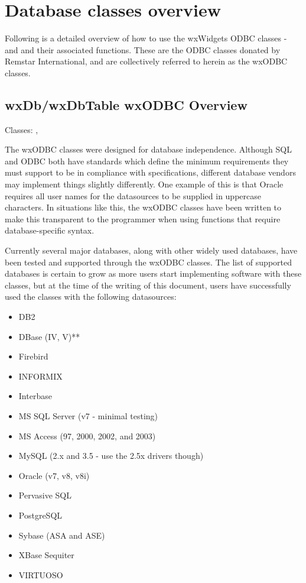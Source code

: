 \section{Database classes overview}\label{odbcoverview}

Following is a detailed overview of how to use the wxWidgets ODBC classes -  
and  and their associated functions. These are 
the ODBC classes donated by Remstar International, and are collectively 
referred to herein as the wxODBC classes.

\subsection{wxDb/wxDbTable wxODBC Overview}\label{wxodbcoverview}

Classes: , 

The wxODBC classes were designed for database independence. Although SQL and 
ODBC both have standards which define the minimum requirements they must 
support to be in compliance with specifications, different database vendors 
may implement things slightly differently. One example of this is that Oracle 
requires all user names for the datasources to be supplied in uppercase 
characters. In situations like this, the wxODBC classes have been written 
to make this transparent to the programmer when using functions that require 
database-specific syntax.

Currently several major databases, along with other widely used databases, 
have been tested and supported through the wxODBC classes. The list of 
supported databases is certain to grow as more users start implementing 
software with these classes, but at the time of the writing of this document, 
users have successfully used the classes with the following datasources:

\begin{itemize}\itemsep=0pt
\item DB2
\item DBase (IV, V)**
\item Firebird
\item INFORMIX
\item Interbase
\item MS SQL Server (v7 - minimal testing)
\item MS Access (97, 2000, 2002, and 2003)
\item MySQL (2.x and 3.5 - use the 2.5x drivers though)
\item Oracle (v7, v8, v8i)
\item Pervasive SQL
\item PostgreSQL
\item Sybase (ASA and ASE)
\item XBase Sequiter
\item VIRTUOSO
\end{itemize}

